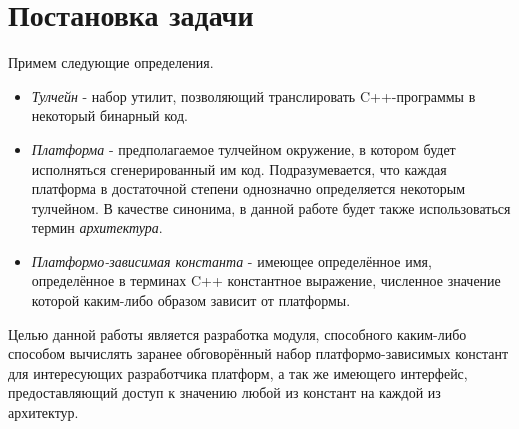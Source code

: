 \chapter{Постановка задачи}
\label{sec:Chapter1} 

Примем следующие определения.

\begin{itemize}
    \item
        \textit{Тулчейн} - набор утилит, позволяющий транслировать C++-программы в некоторый бинарный код.
    \item
        \textit{Платформа} - предполагаемое тулчейном окружение, в котором будет исполняться сгенерированный им код. Подразумевается, что каждая платформа в достаточной степени однозначно определяется некоторым тулчейном. В качестве синонима, в данной работе будет также использоваться термин \textit{архитектура}.
    \item
        \textit{Платформо-зависимая константа} - имеющее определённое имя, определённое в терминах C++ константное выражение, численное значение которой каким-либо образом зависит от платформы.
\end{itemize}

Целью данной работы является разработка модуля, способного каким-либо способом вычислять заранее обговорённый набор платформо-зависимых констант для интересующих разработчика платформ, а так же имеющего интерфейс, предоставляющий доступ к значению любой из констант на каждой из архитектур.
\newpage